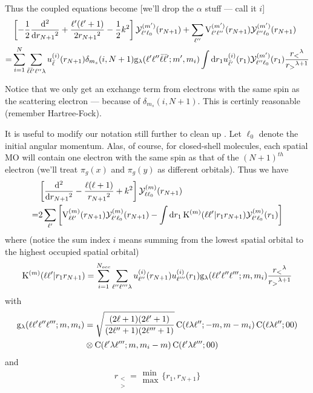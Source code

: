 \documentclass[aps,pra,groupedaddress,12pt,
               amsfonts,amssymb,
               preprint
    ]{revtex4}
\begin{document}
Thus the coupled equations  become [we'll drop the $\alpha$
stuff --- call it $i$]
\begin{equation}
  \label{eq:esscf}
    \begin{split}
    &\left[-\dfrac{1}{2}\dfrac{\mathrm{d}^2}{\mathrm{d}
        r_{N+1}{}^2}+\dfrac{\ell'(\ell'+1)}{2r_{N+1}{}^2}-\dfrac{1}{2}k^2\right]\mathcal{Y}_{\ell'\ell_0}^{(m')}(r_{N+1})
      + \sum_{\ell''}\mathrm{V}_{\ell'\ell''}^{(m')}(r_{N+1})\mathcal{Y}_{\ell''\ell_0}^{(m')}(r_{N+1}) \\
   = &\sum_{i=1}^{N}\sum_{\bar{\ell}\bar{\ell}'\ell''\lambda}
      u_{\bar{\ell}}^{(i)}(r_{N+1})\delta_{m_s}(i,N+1)\mathrm{g}_{\lambda}(\ell'\ell''\bar{\ell}\bar{\ell}';m',m_i)\int\mathrm{d}
      r_1u_{\bar{\ell}'}^{(i)}(r_1)\mathcal{Y}_{\ell''\ell_0}^{(m')}(r_1)\dfrac{r_<{}^\lambda}{r_>{}^{\lambda+1}}
  \end{split}
\end{equation}

Notice that we only get an exchange term from electrons with the same
spin as the scattering electron --- because of $\delta_{m_s}(i,N+1)$.
This is certinly reasonable (remember Hartree-Fock).

It is useful to modify our notation still further to clean up
. Let $\ell_0$ denote the initial angular momentum. Alas, of
course, for closed-shell molecules, each spatial MO will contain one
electron with the same spin as that of the $(N+1)^{th}$ electron (we'll
treat $\pi_g(x)$ and $\pi_g(y)$ as different orbitals). Thus we have
\begin{equation}
  \label{eq:CEES}
  \begin{split}
    &\left[\dfrac{\mathrm{d}^2}{\mathrm{d} r_{N+1}{}^2}
      -\dfrac{\ell(\ell+1)}{r_{N+1}{}^2}+k^2\right]\mathcal{Y}_{\ell\ell_0}^{(m)}(r_{N+1}) \\
    = & 2\sum_{\ell'}\left[\mathrm{V}_{\ell\ell'}^{(m)}(r_{N+1})\mathcal{Y}_{\ell'\ell_0}^{(m)}(r_{N+1}) - \int\mathrm{d}
      r_1\,\mathrm{K}^{(m)}(\ell\ell'|r_1r_{N+1})\mathcal{Y}_{\ell'\ell_0}^{(m)}(r_{1})\right]
  \end{split}
\end{equation}
where (notice the sum index $i$ means summing from the lowest spatial
orbital to the highest occupied spatial orbital)
\begin{equation}
  \label{eq:KEX}
  \mathrm{K}^{(m)}(\ell\ell'|r_1r_{N+1}) = \sum_{i=1}^{N_{occ}}\sum_{\ell''\ell'''\lambda}
  u_{\ell''}^{(i)}(r_{N+1})u_{\ell'''}^{(i)}(r_1)\mathrm{g}_{\lambda}(\ell\ell'\ell''\ell''';m,m_i)\dfrac{r_<{}^\lambda}{r_>{}^{\lambda+1}}
\end{equation}
with
\begin{equation}
  \label{eq:glm}
  \begin{split}
  \mathrm{g}_{\lambda}(\ell\ell'\ell''\ell''';m,m_i) & = \sqrt{\dfrac{(2\ell+1)(2\ell'+1)}{(2\ell''+1)(2\ell'''+1)}}\,
  \mathrm{C}(\ell\lambda\ell'';-m,m-m_i)\,\mathrm{C}(\ell\lambda\ell'';00) \\
  & \otimes \mathrm{C}(\ell'\lambda\ell''';m,m_i-m)\,\mathrm{C}(\ell'\lambda\ell''';00)
  \end{split}
\end{equation}
and
\begin{equation}
  \label{eq:rlam}
  r_{\substack{< \\ >}} = \substack{\min \\ \max}\big\{r_1,r_{N+1}\big\}
\end{equation}
\end{document}
